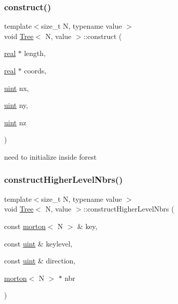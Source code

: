\subsubsection{\texorpdfstring{construct()}{construct()}}
{\footnotesize\ttfamily template$<$size\+\_\+t N, typename value $>$ \\
void \mbox{\hyperlink{classTree}{Tree}}$<$ N, value $>$\+::construct (\begin{DoxyParamCaption}\item[{\mbox{\hyperlink{definitions_8h_aedc0ad84d1e764530814f57ad931d02a}{real}} $\ast$}]{length,  }\item[{\mbox{\hyperlink{definitions_8h_aedc0ad84d1e764530814f57ad931d02a}{real}} $\ast$}]{coords,  }\item[{\mbox{\hyperlink{definitions_8h_a69aa29b598b851b0640aa225a9e5d61d}{uint}}}]{nx,  }\item[{\mbox{\hyperlink{definitions_8h_a69aa29b598b851b0640aa225a9e5d61d}{uint}}}]{ny,  }\item[{\mbox{\hyperlink{definitions_8h_a69aa29b598b851b0640aa225a9e5d61d}{uint}}}]{nz }\end{DoxyParamCaption})}

need to initialize inside forest \mbox{\label{classTree_abe71f9daa0c90b01a9144ade766c500f}} 
\subsubsection{\texorpdfstring{construct\+Higher\+Level\+Nbrs()}{constructHigherLevelNbrs()}}
{\footnotesize\ttfamily template$<$size\+\_\+t N, typename value $>$ \\
void \mbox{\hyperlink{classTree}{Tree}}$<$ N, value $>$\+::construct\+Higher\+Level\+Nbrs (\begin{DoxyParamCaption}\item[{const \mbox{\hyperlink{definitions_8h_af8682350bd8bb38ee9023f7a0a310add}{morton}}$<$ N $>$ \&}]{key,  }\item[{const \mbox{\hyperlink{definitions_8h_a69aa29b598b851b0640aa225a9e5d61d}{uint}} \&}]{keylevel,  }\item[{const \mbox{\hyperlink{definitions_8h_a69aa29b598b851b0640aa225a9e5d61d}{uint}} \&}]{direction,  }\item[{\mbox{\hyperlink{definitions_8h_af8682350bd8bb38ee9023f7a0a310add}{morton}}$<$ N $>$ $\ast$}]{nbr }\end{DoxyParamCaption})}


